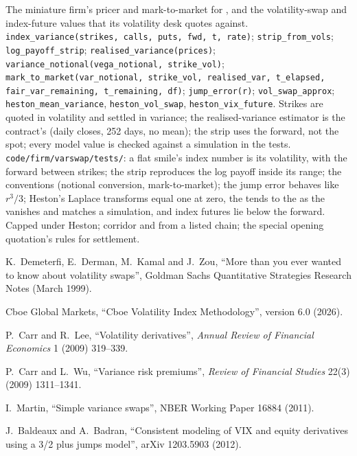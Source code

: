 \begin{build}
 The miniature firm's pricer and mark-to-market for , and the volatility-swap and
index-future values that its volatility desk quotes against.
 \texttt{index\_variance(strikes, calls, puts, fwd, t, rate)}; \texttt{strip\_from\_vols};
\texttt{log\_payoff\_strip}; \texttt{realised\_variance(prices)}; \texttt{variance\_notional(vega\_notional,
strike\_vol)}; \texttt{mark\_to\_market(var\_notional, strike\_vol, realised\_var, t\_elapsed,
fair\_var\_remaining, t\_remaining, df)}; \texttt{jump\_error(r)}; \texttt{vol\_swap\_approx};
\texttt{heston\_mean\_variance}, \texttt{heston\_vol\_swap}, \texttt{heston\_vix\_future}.
 Strikes are quoted in volatility and settled in variance; the realised-variance estimator is the
contract's (daily closes, 252 days, no mean); the strip uses the forward, not the spot; every model value is
checked against a simulation in the tests.
 \texttt{code/firm/varswap/tests/}: a flat smile's index number is its volatility,
with the forward between strikes; the strip reproduces the log payoff inside its range; the conventions
(notional conversion, mark-to-market); the jump error behaves like $r^3/3$; Heston's Laplace transforms equal one
at zero, the  tends to the  as the  vanishes and matches a
simulation, and index futures lie below the forward.
 Capped  under Heston; corridor and  from a listed chain; the special
opening quotation's rules for settlement.
\end{build}

\begin{omsources}
\item K.~Demeterfi, E.~Derman, M.~Kamal and J.~Zou, ``More than you ever wanted to know about volatility swaps'',
Goldman Sachs Quantitative Strategies Research Notes (March 1999).
\item Cboe Global Markets, ``Cboe Volatility Index Methodology'', version 6.0 (2026).
\item P.~Carr and R.~Lee, ``Volatility derivatives'', \emph{Annual Review of Financial Economics} 1 (2009) 319--339.
\item P.~Carr and L.~Wu, ``Variance risk premiums'', \emph{Review of Financial Studies} 22(3) (2009) 1311--1341.
\item I.~Martin, ``Simple variance swaps'', NBER Working Paper 16884 (2011).
\item J.~Baldeaux and A.~Badran, ``Consistent modeling of VIX and equity derivatives using a 3/2 plus jumps
model'', arXiv 1203.5903 (2012).
\end{omsources}

